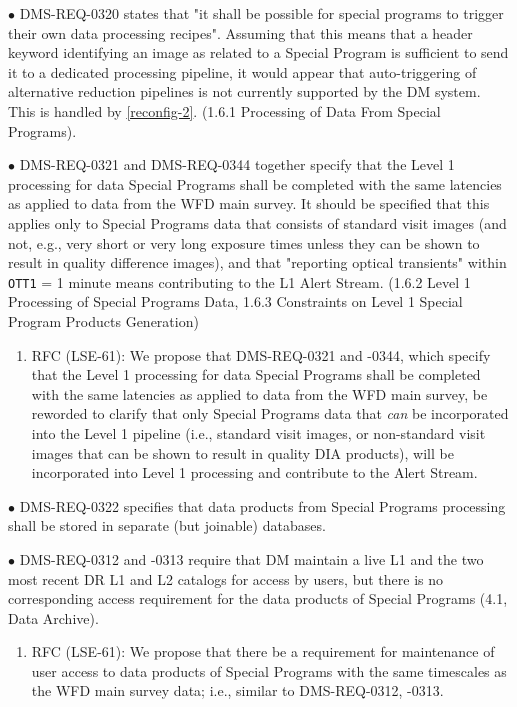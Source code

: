 $\bullet$ DMS-REQ-0320 states that "it shall be possible for special programs to trigger their own data processing recipes". Assuming that this means that a header keyword identifying an image as related to a Special Program is sufficient to send it to a dedicated processing pipeline, it would appear that auto-triggering of alternative reduction pipelines is not currently supported by the DM system. This is handled by \ref{reconfig-2}. (1.6.1 Processing of Data From Special Programs).

$\bullet$ DMS-REQ-0321 and DMS-REQ-0344 together specify that the Level 1 processing for data Special Programs shall be completed with the same latencies as applied to data from the WFD main survey. It should be specified that this applies only to Special Programs data that consists of standard visit images (and not, e.g., very short or very long exposure times unless they can be shown to result in quality difference images), and that "reporting optical transients" within \texttt{OTT1} = 1 minute means contributing to the L1 Alert Stream. (1.6.2 Level 1 Processing of Special Programs Data, 1.6.3 Constraints on Level 1 Special Program Products Generation)
\begin{enumerate}[resume,topsep=-10pt,after=\vspace{10pt},label= \textbf{Action \Roman*}] \item \label{DMSR-6} RFC (LSE-61): We propose that DMS-REQ-0321 and -0344, which specify that the Level 1 processing for data Special Programs shall be completed with the same latencies as applied to data from the WFD main survey, be reworded to clarify that only Special Programs data that \textit{can} be incorporated into the Level 1 pipeline (i.e., standard visit images, or non-standard visit images that can be shown to result in quality DIA products), will be incorporated into Level 1 processing and contribute to the Alert Stream. \end{enumerate}

$\bullet$ DMS-REQ-0322 specifies that data products from Special Programs processing shall be stored in separate (but joinable) databases.

$\bullet$ DMS-REQ-0312 and -0313 require that DM maintain a live L1 and the two most recent DR L1 and L2 catalogs for access by users, but there is no corresponding access requirement for the data products of Special Programs (4.1, Data Archive).
\begin{enumerate}[resume,topsep=-10pt,after=\vspace{10pt},label= \textbf{Action \Roman*}] \item \label{DMSR-7} RFC (LSE-61): We propose that there be a requirement for maintenance of user access to data products of Special Programs with the same timescales as the WFD main survey data; i.e., similar to DMS-REQ-0312, -0313. \end{enumerate}


